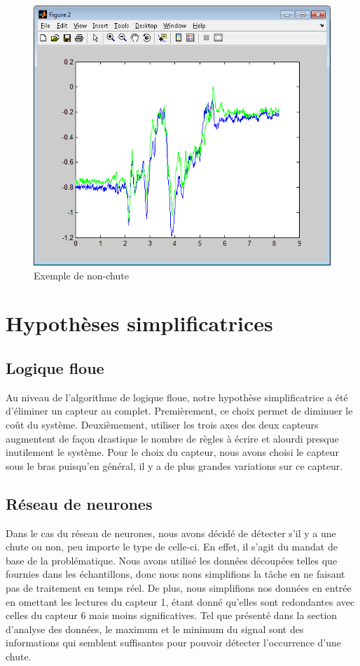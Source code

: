 \documentclass[12pt,letterpaper]{article}
\begin{document}
\begin{figure}
\centering
\includegraphics[scale=0.5]{images/non_chute.png}
\caption{Exemple de non-chute}
\label{fig:non_chute}
\end{figure}

\section{Hypothèses simplificatrices}

\subsection{Logique floue}

Au niveau de l'algorithme de logique floue, notre hypothèse simplificatrice a été d'éliminer un capteur au complet. Premièrement, ce choix permet de diminuer le coût du système. Deuxièmement, utiliser les trois axes des deux capteurs augmentent de façon drastique le nombre de règles à écrire et alourdi presque inutilement le système. Pour le choix du capteur, nous avons choisi le capteur sous le bras puisqu'en général, il y a de plus grandes variations sur ce capteur.

\subsection{Réseau de neurones} %
Dans le cas du réseau de neurones, nous avons décidé de détecter s'il y a une chute ou non, peu importe le type de celle-ci. En effet, il s'agit du mandat de base de la problématique. Nous avons utilisé les données découpées telles que fournies dans les échantillons, donc nous nous simplifions la tâche en ne faisant pas de traitement en temps réel. De plus, nous simplifions nos données en entrée en omettant les lectures du capteur 1, étant donné qu'elles sont redondantes avec celles du capteur 6 mais moins significatives. Tel que présenté dans la section d'analyse des données, le maximum et le minimum du signal sont des informations qui semblent suffisantes pour pouvoir détecter l'occurrence d'une chute.
\end{document}
